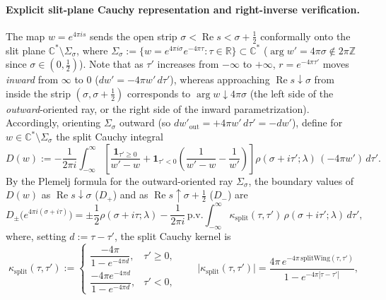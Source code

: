 \documentclass[11pt,a4paper]{article}
\begin{document}
\paragraph{Explicit slit-plane Cauchy representation and right-inverse verification.}
The map $w=e^{4\pi i s}$ sends the open strip $\sigma<\operatorname{Re}s<\sigma+\tfrac12$ conformally onto
the slit plane $\mathbb{C}^*\setminus\Sigma_\sigma$, where
$\Sigma_\sigma := \{w = e^{4\pi i\sigma} e^{-4\pi\tau} : \tau\in\mathbb{R}\}\subset\mathbb{C}^*$
($\arg w'=4\pi\sigma\notin 2\pi\mathbb{Z}$ since $\sigma\in(0,\tfrac12)$).
Note that as $\tau'$ increases from $-\infty$ to $+\infty$, $r=e^{-4\pi\tau'}$ moves \emph{inward}
from $\infty$ to $0$ ($dw'=-4\pi w'\,d\tau'$), whereas approaching $\operatorname{Re}s\downarrow\sigma$
from inside the strip $(\sigma,\sigma+\tfrac12)$ corresponds to $\arg w\downarrow 4\pi\sigma$
(the left side of the \emph{outward}-oriented ray, or the right side of the inward parametrization).
Accordingly, orienting $\Sigma_\sigma$ outward (so $dw'_{\mathrm{out}}=+4\pi w'\,d\tau'=-dw'$),
define for $w\in\mathbb{C}^*\setminus\Sigma_\sigma$ the split Cauchy integral
\begin{equation}\label{eq:app_D}
D(w) := -\frac{1}{2\pi i}\int_{-\infty}^\infty
\left[\frac{\mathbf{1}_{\tau'\ge 0}}{w'-w}
+ \mathbf{1}_{\tau'<0}\left(\frac{1}{w'-w}-\frac{1}{w'}\right)\right]
\rho(\sigma+i\tau';\lambda)\,(-4\pi w')\,d\tau'.
\end{equation}
By the Plemelj formula for the outward-oriented ray $\Sigma_\sigma$, the boundary values of $D(w)$
as $\operatorname{Re}s\downarrow\sigma$ ($D_+$) and as $\operatorname{Re}s\uparrow\sigma+\tfrac12$ ($D_-$) are
\begin{equation}\label{eq:app_plemelj}
D_\pm\bigl(e^{4\pi i(\sigma+i\tau)}\bigr)
= \pm\frac{1}{2}\rho(\sigma+i\tau;\lambda)
- \frac{1}{2\pi i}\,\mathrm{p.v.}\int_{-\infty}^\infty \kappa_{\mathrm{split}}(\tau,\tau')\,\rho(\sigma+i\tau';\lambda)\,d\tau',
\end{equation}
where, setting $d:=\tau-\tau'$, the split Cauchy kernel is
\begin{equation}\label{eq:app_kappa}
\kappa_{\mathrm{split}}(\tau,\tau') :=
\begin{cases}
\dfrac{-4\pi}{1-e^{-4\pi d}}, & \tau'\ge 0, \\[8pt]
\dfrac{-4\pi e^{-4\pi d}}{1-e^{-4\pi d}}, & \tau'<0,
\end{cases}
\qquad
\bigl|\kappa_{\mathrm{split}}(\tau,\tau')\bigr|
= \frac{4\pi\,e^{-4\pi\,\mathrm{splitWing}(\tau,\tau')}}{1-e^{-4\pi|\tau-\tau'|}},
\end{equation}
\end{document}
